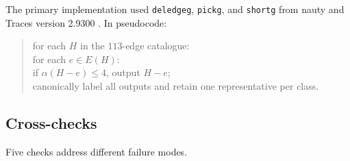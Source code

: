 \documentclass[10pt]{article}
\theoremstyle{definition}
\theoremstyle{remark}
\begin{document}
The primary implementation used \texttt{deledgeg}, \texttt{pickg}, and
\texttt{shortg} from nauty and Traces version 2.9300
\cite{mckay-1998,mckay-piperno-2014}.  In pseudocode:
\begin{quote}
\small
for each $H$ in the $113$-edge catalogue:\\
\hspace*{1em}for each $e\in E(H)$:\\
\hspace*{2em}if $\alpha(H-e)\leq4$, output $H-e$;\\
canonically label all outputs and retain one representative per class.
\end{quote}

\subsection{Cross-checks}

Five checks address different failure modes.
\end{document}
